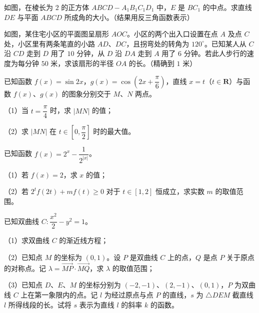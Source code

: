 \Needspace{0.4\textheight}
\begingroup
\renewenvironment{question}{\Needspace{0.44\textheight}}{}
\begin{question}
如图，在棱长为 $2$ 的正方体 $ABCD-A_1B_1C_1D_1$ 中，$E$ 是 $BC_1$ 的中点。求直线 $DE$ 与平面 $ABCD$ 所成角的大小。（结果用反三角函数表示）
\nopagebreak[4]
\begin{center}\end{center}
\nopagebreak[4]
\Needspace{0.4\textheight}
\end{question}
\endgroup
\begin{question}
如图，某住宅小区的平面图呈扇形 $AOC$。小区的两个出入口设置在点 $A$ 及点 $C$ 处，小区里有两条笔直的小路 $AD$、$DC$，且拐弯处的转角为 $120^\circ$。已知某人从 $C$ 沿 $CD$ 走到 $D$ 用了 $10$ 分钟，从 $D$ 沿 $DA$ 走到 $A$ 用了 $6$ 分钟。若此人步行的速度为每分钟 $50$ 米，求该扇形的半径 $OA$ 的长。（精确到 $1$ 米）
\nopagebreak[4]
\begin{center}\end{center}
\nopagebreak[4]
\end{question}
\begin{question}
已知函数 $f(x)=\sin2x$，$g(x)=\cos\left(2x+\dfrac{\pi}6\right)$，直线 $x=t$（$t\in\mathbf R$）与函数 $f(x)$、$g(x)$ 的图象分别交于 $M$、$N$ 两点。

（1）当 $t=\dfrac{\pi}4$ 时，求 $|MN|$ 的值；

（2）求 $|MN|$ 在 $t\in\left[0,\dfrac{\pi}2\right]$ 时的最大值。

\end{question}
\begin{question}
已知函数 $f(x)=2^x-\dfrac1{2^{|x|}}$。

（1）若 $f(x)=2$，求 $x$ 的值；

（2）若 $2^tf(2t)+mf(t)\geqslant0$ 对于 $t\in[1,2]$ 恒成立，求实数 $m$ 的取值范围。

\end{question}
\begin{question}
已知双曲线 $C:\dfrac{x^2}2-y^2=1$。

（1）求双曲线 $C$ 的渐近线方程；

（2）已知点 $M$ 的坐标为 $(0,1)$。设 $P$ 是双曲线 $C$ 上的点，$Q$ 是点 $P$ 关于原点的对称点。记 $\lambda=\overrightarrow{MP}\cdot\overrightarrow{MQ}$，求 $\lambda$ 的取值范围；

（3）已知点 $D$、$E$、$M$ 的坐标分别为 $(-2,-1)$、$(2,-1)$、$(0,1)$，$P$ 为双曲线 $C$ 上在第一象限内的点。记 $l$ 为经过原点与点 $P$ 的直线，$s$ 为 $\triangle DEM$ 截直线 $l$ 所得线段的长。试将 $s$ 表示为直线 $l$ 的斜率 $k$ 的函数。

\end{question}
